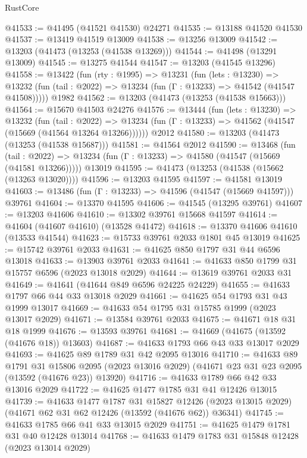 \begin{lexlean}{RustCore}
\begin{coremodule}
@41533 := @41495 (@41521 @41530) @24271
@41535 := @13188 @41520 @41530
@41537 := @13419 @41519 @13009
@41538 := @13256 @13009
@41542 := @13203 (@41473 (@13253 (@41538 @13269)))
@41544 := @41498 (@13291 @13009)
@41545 := @13275 @41544
@41547 := @13203 (@41545 @13296)
@41558 := @13422
    (fun (rty : @1995) =>
    @13231
      (fun (lets : @13230) =>
      @13232 (fun (tail : @2022) => @13234 (fun (Γ : @13233) => @41542 (@41547 @41508)))))
    @1982
@41562 := @13203 (@41473 (@13253 (@41538 @15663)))
@41564 := @15670 @41503 @24276
@41576 := @13444
    (fun (lets : @13230) =>
    @13232
      (fun (tail : @2022) =>
      @13234 (fun (Γ : @13233) => @41562 (@41547 (@15669 (@41564 @13264 @13266))))))
    @2012
@41580 := @13203 (@41473 (@13253 (@41538 @15687)))
@41581 := @41564 @2012
@41590 := @13468
    (fun (tail : @2022) => @13234 (fun (Γ : @13233) => @41580 (@41547 (@15669 (@41581 @13266)))))
    @13019
@41595 := @41473 (@13253 (@41538 (@15662 (@13263 @13020))))
@41596 := @13203 @41595
@41597 := @41581 @13019
@41603 := @13486 (fun (Γ : @13233) => @41596 (@41547 (@15669 @41597))) @39761
@41604 := @13370 @41595
@41606 := @41545 (@13295 @39761)
@41607 := @13203 @41606
@41610 := @13302 @39761 @15668 @41597
@41614 := @41604 (@41607 @41610) (@13528 @41472)
@41618 := @13370 @41606 @41610 (@13533 @41544)
@41623 := @15733 @39761 @2033 @1801 @45 @13019
@41625 := @15742 @39761 @2033
@41631 := @41625 @850 @1797 @31 @44 @6596 @13018
@41633 := @13903 @39761 @2033
@41641 := @41633 @850 @1799 @31 @15757 @6596 (@2023 @13018 @2029)
@41644 := @13619 @39761 @2033 @31
@41649 := @41641 (@41644 @849 @6596 @24225 @24229)
@41655 := @41633 @1797 @66 @44 @33 @13018 @2029
@41661 := @41625 @54 @1793 @31 @43 @1999 @13017
@41669 := @41633 @54 @1795 @31 @15785 @1999 (@2023 @13017 @2029)
@41671 := @13584 @39761 @2033
@41675 := @41671 @18 @31 @18 @1999
@41676 := @13593 @39761
@41681 := @41669 (@41675 (@13592 (@41676 @18)) @13603)
@41687 := @41633 @1793 @66 @43 @33 @13017 @2029
@41693 := @41625 @89 @1789 @31 @42 @2095 @13016
@41710 := @41633
    @89
    @1791
    @31
    @15806
    @2095
    (@2023 @13016 @2029)
    (@41671 @23 @31 @23 @2095 (@13592 (@41676 @23)) @13920)
@41716 := @41633 @1789 @66 @42 @33 @13016 @2029
@41722 := @41625 @1477 @1785 @31 @41 @12426 @13015
@41739 := @41633
    @1477
    @1787
    @31
    @15827
    @12426
    (@2023 @13015 @2029)
    (@41671 @62 @31 @62 @12426 (@13592 (@41676 @62)) @36341)
@41745 := @41633 @1785 @66 @41 @33 @13015 @2029
@41751 := @41625 @1479 @1781 @31 @40 @12428 @13014
@41768 := @41633
    @1479
    @1783
    @31
    @15848
    @12428
    (@2023 @13014 @2029)

\end{coremodule}
\end{lexlean}
